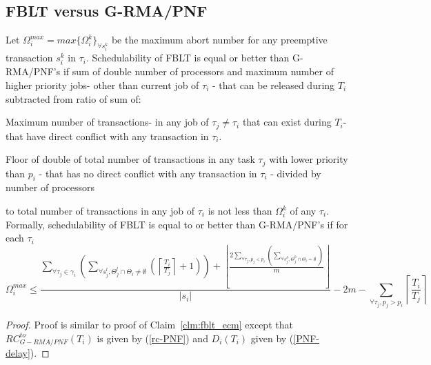 \subsection{FBLT versus G-RMA/PNF}\label{subsec:fblt_vs_grma_pnf}
%
\begin{clm}\label{clm:fblt_vs_grma_pnf}
%
Let $\Omega_i^{max}=max\{\Omega_i^k\}_{\forall s_i^k}$ be the maximum abort number for any preemptive transaction $s_i^k$ in $\tau_i$. Schedulability of FBLT is equal or better than G-RMA/PNF's if sum of double number of processors and maximum number of higher priority jobs- other than current job of $\tau_i$ - that can be released during $T_i$ subtracted from ratio of sum of:
%
\begin{compactitem}
\item Maximum number of transactions- in any job of $\tau_j \neq \tau_i$ that can exist during $T_i$- that have direct conflict with any transaction in $\tau_i$.
\item Floor of double of total number of transactions in any task $\tau_{j}$ with lower priority than $p_i$ - that has no direct conflict with any transaction in $\tau_{i}$ - divided by number of processors
\end{compactitem}
%
to total number of transactions in any job of $\tau_i$ is not less than $\Omega_i^k$ of any $\tau_i$. Formally, schedulability of FBLT is equal to or better than G-RMA/PNF's if for each $\tau_i$ 
%
\begin{equation}
\Omega_{i}^{max}
\le \frac{\sum_{\forall\tau_{j}\in\gamma_{i}}\left(\sum_{\forall s_{j}^{l},\Theta_{j}^{l}\cap\Theta_{i}\neq\emptyset}\left(\left\lceil \frac{T_{i}}{T_{j}}\right\rceil +1\right)\right)+\left\lfloor \frac{2\sum_{\forall\tau_{j},p_{j}<p_{i}}\left(\sum_{\forall s_{j}^{h},\Theta_{j}^{h}\cap\Theta_{i}=\emptyset}\right)}{m}\right\rfloor }{|s_{i}|}-2m-\sum_{\forall\tau_{j},p_{j}>p_{i}}\left\lceil \frac{T_{i}}{T_{j}}\right\rceil \label{eq:fblt_vs_grma_pnf_3}
\end{equation}
%
\end{clm}
%
\begin{proof}
%
Proof is similar to proof of Claim~\ref{clm:fblt_ecm} except that $RC_{G-RMA/PNF}^{to}(T_i)$ is given by (\ref{rc-PNF}) and $D_i(T_i)$ given by (\ref{PNF-delay}).
%
\end{proof}
%
